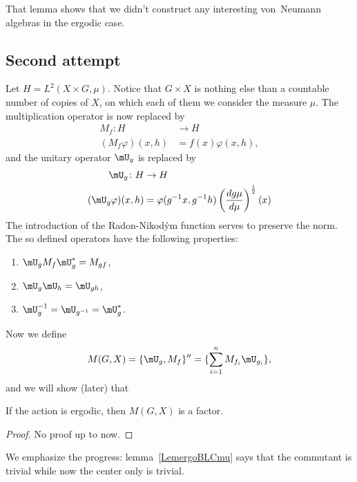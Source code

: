 That lemma shows that we didn't construct any interesting von~Neumann algebras in the ergodic case.

\subsection{Second attempt}

Let $H= L^2(X\times G,\mu)$. Notice that $G\times X$ is nothing else than a countable number of copies of $X$, on which each of them we consider the measure $\mu$. The multiplication operator is now replaced by
\begin{equation}
	\begin{aligned}
		M_f\colon H       & \to H              \\
		(M_f\varphi)(x,h) & =f(x)\varphi(x,h),
	\end{aligned}
\end{equation}
and the unitary operator $\mU_g$ is replaced by
\begin{equation}
	\begin{aligned}
		\mU_g\colon H       & \to H                                                                                \\
		(\mU_g\varphi)(x,h) & =\varphi(g^{-1}x,g^{-1} h)\left( \frac{ d g\mu }{ d \mu } \right)^{\frac{ 1 }{2}}(x)
	\end{aligned}
\end{equation}
The introduction of the Radon-Nikod\'ym function serves to preserve the norm. The so defined operators have the following properties:
\begin{enumerate}
	\item $\mU_g M_f\mU_g^*=M_{gf}$,
	\item $\mU_g\mU_h=\mU_{gh}$,
	\item $\mU_g^{-1}=\mU_{g^{-1}}=\mU_g^*$.
\end{enumerate}
Now we define
\begin{equation}
	M(G,X)=\{ \mU_g,M_f \}''=\{ \sum_{i=1}^nM_{f_i}\mU_{g_i} \},
\end{equation}
and we will show (later) that
\begin{theorem}
	If the action is ergodic, then $M(G,X)$ is a factor.
\end{theorem}
\begin{proof}
	No proof up to now.
\end{proof}
We emphasize the progress: lemma~\ref{LemergoBLCmu} says that the commutant is trivial while now the center only is trivial.

